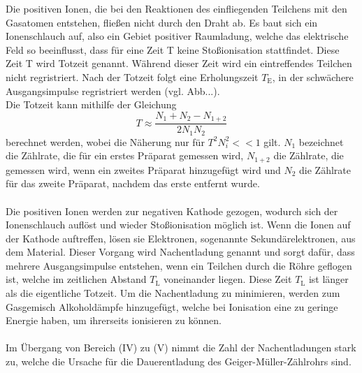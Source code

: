     Die positiven Ionen, die bei den Reaktionen des einfliegenden Teilchens mit den Gasatomen
    entstehen, fließen nicht durch den Draht ab.
    Es baut sich ein Ionenschlauch auf, also ein Gebiet positiver Raumladung, welche das
    elektrische Feld so beeinflusst, dass für eine Zeit T keine Stoßionisation stattfindet.
    Diese Zeit T wird Totzeit genannt. Während dieser Zeit wird ein eintreffendes Teilchen
    nicht regristriert. Nach der Totzeit folgt eine Erholungszeit $T_\text{E}$, in der 
    schwächere Ausgangsimpulse regristriert werden (vgl. Abb...).\\
    Die Totzeit kann mithilfe der Gleichung 
    \begin{equation}
        T \approx \frac{N_1 + N_2 - N_{1+2}}{2 N_1 N_2} \label{eqn:totzeit}
    \end{equation}
    berechnet werden, wobei die Näherung nur für $T^2 N_i ^2 << 1$ gilt.
    $N_1$ bezeichnet die Zählrate, die für ein erstes Präparat gemessen wird,
    $N_{1+2}$ die Zählrate, die gemessen wird, wenn ein zweites Präparat hinzugefügt wird und
    $N_2$ die Zählrate für das zweite Präparat, nachdem das erste entfernt wurde.\\
    \\
    Die positiven Ionen werden zur negativen Kathode gezogen, wodurch sich der Ionenschlauch
    auflöst und wieder Stoßionisation möglich ist.
    Wenn die Ionen auf der Kathode auftreffen, lösen sie Elektronen, sogenannte
    Sekundärelektronen, aus dem Material.
    Dieser Vorgang wird Nachentladung genannt und sorgt dafür, dass mehrere Ausgangsimpulse 
    entstehen, wenn ein Teilchen durch die Röhre geflogen ist, welche 
    im zeitlichen Abstand $T_\text{L}$ voneinander liegen. 
    Diese Zeit $T_\text{L}$ ist länger als die eigentliche Totzeit.
    Um die Nachentladung zu minimieren, werden zum Gasgemisch Alkoholdämpfe hinzugefügt, 
    welche bei Ionisation eine zu geringe Energie haben, um ihrerseits ionisieren zu können.\\
    \\
    Im Übergang von Bereich (IV) zu (V) nimmt die Zahl der Nachentladungen stark zu, 
    welche die Ursache für die Dauerentladung des Geiger-Müller-Zählrohrs sind.


